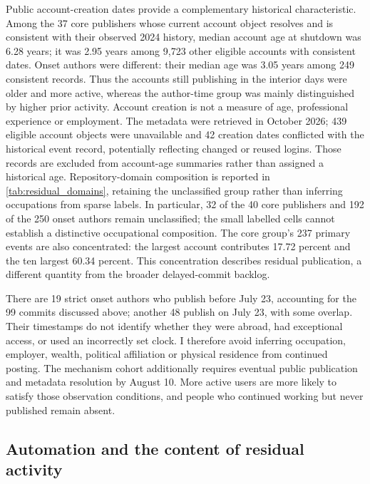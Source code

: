 Public account-creation dates provide a complementary historical characteristic. Among the 37 core publishers whose current account object resolves and is consistent with their observed 2024 history, median account age at shutdown was 6.28 years; it was 2.95 years among 9,723 other eligible accounts with consistent dates. Onset authors were different: their median age was 3.05 years among 249 consistent records. Thus the accounts still publishing in the interior days were older and more active, whereas the author-time group was mainly distinguished by higher prior activity. Account creation is not a measure of age, professional experience or employment. The metadata were retrieved in October 2026; 439 eligible account objects were unavailable and 42 creation dates conflicted with the historical event record, potentially reflecting changed or reused logins. Those records are excluded from account-age summaries rather than assigned a historical age. Repository-domain composition is reported in \cref{tab:residual_domains}, retaining the unclassified group rather than inferring occupations from sparse labels. In particular, 32 of the 40 core publishers and 192 of the 250 onset authors remain unclassified; the small labelled cells cannot establish a distinctive occupational composition. The core group's 237 primary events are also concentrated: the largest account contributes 17.72 percent and the ten largest 60.34 percent. This concentration describes residual publication, a different quantity from the broader delayed-commit backlog.

There are 19 strict onset authors who publish before July 23, accounting for the 99 commits discussed above; another 48 publish on July 23, with some overlap. Their timestamps do not identify whether they were abroad, had exceptional access, or used an incorrectly set clock. I therefore avoid inferring occupation, employer, wealth, political affiliation or physical residence from continued posting. The mechanism cohort additionally requires eventual public publication and metadata resolution by August 10. More active users are more likely to satisfy those observation conditions, and people who continued working but never published remain absent.



\subsection{Automation and the content of residual activity}
\label{sec:automation_audit}

